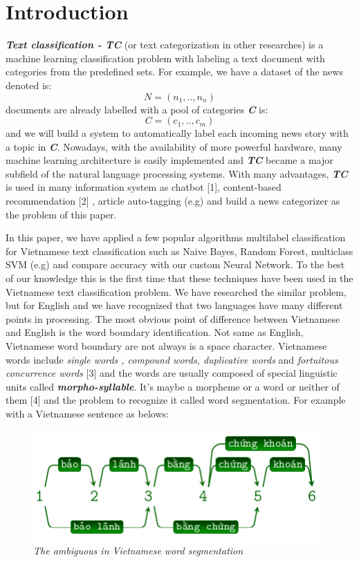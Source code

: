 \documentclass[conference]{IEEEtran}
\begin{document}
\section{Introduction}
\textit{\textbf{Text classification - TC}} (or text categorization in other researches) is a machine learning classification problem with labeling a text document with categories from the predefined
sets. For example, we have a dataset of the news denoted is:
\[ N=(n_1,..,n_n) \]
documents are already labelled with a pool of categories \textbf{\textit{C}} is: \[C=(c_1,..,c_m)\]
and we will build a system to automatically label each incoming
news story with a topic in \textbf{\textit{C}}. Nowadays, with the availability
of more powerful hardware, many machine learning
architecture is easily implemented and \textbf{\textit{TC}} became a major
subfield of the natural language processing systems. With
many advantages, \textbf{\textit{TC}} is used in many information system as
chatbot [1], content-based recommendation [2]
, article auto-tagging
(e.g) and build a news categorizer as the problem of this paper.

In this paper, we have applied a few popular algorithms
multilabel classification for Vietnamese text classification such
as Naive Bayes, Random Forest, multiclass SVM (e.g) and
compare accuracy with our custom Neural Network. To the
best of our knowledge this is the first time that these techniques
have been used in the Vietnamese text classification problem.
We have researched the similar problem, but for English and
we have recognized that two languages have many different
points in processing. The most obvious point of difference
between Vietnamese and English is the word boundary identification. 
Not same as English, Vietnamese word boundary
are not always is a space character. Vietnamese words include
\textit{single words , compound words, duplicative words} 
and \textit{fortuitous concurrence words} [3]
and the words are usually
composed of special linguistic units called \textit{\textbf{morpho-syllable}}.
It’s maybe a morpheme or a word or neither of them [4] and
the problem to recognize it called word segmentation. For
example with a Vietnamese sentence as belows:

\begin{figure}[h]
\includegraphics[scale=0.5]{vietnam_sentence.png}
\centering
\caption{\textit{The ambiguous in Vietnamese word segmentation}}
\end{figure}
\end{document}
